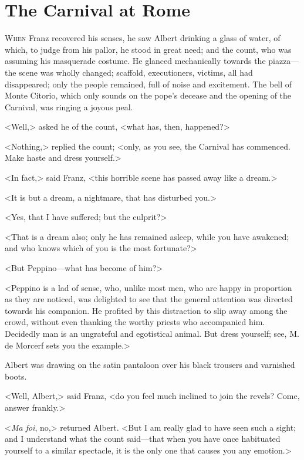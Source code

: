 \chapter{The Carnival at Rome} 

 \lettrine{W}{hen} Franz recovered his senses, he saw Albert drinking a glass of water, of which, to judge from his pallor, he stood in great need; and the count, who was assuming his masquerade costume. He glanced mechanically towards the piazza—the scene was wholly changed; scaffold, executioners, victims, all had disappeared; only the people remained, full of noise and excitement. The bell of Monte Citorio, which only sounds on the pope's decease and the opening of the Carnival, was ringing a joyous peal. 

 <Well,> asked he of the count, <what has, then, happened?> 

 <Nothing,> replied the count; <only, as you see, the Carnival has commenced. Make haste and dress yourself.> 

 <In fact,> said Franz, <this horrible scene has passed away like a dream.> 

 <It is but a dream, a nightmare, that has disturbed you.> 

 <Yes, that I have suffered; but the culprit?> 

 <That is a dream also; only he has remained asleep, while you have awakened; and who knows which of you is the most fortunate?> 

 <But Peppino—what has become of him?> 

 <Peppino is a lad of sense, who, unlike most men, who are happy in proportion as they are noticed, was delighted to see that the general attention was directed towards his companion. He profited by this distraction to slip away among the crowd, without even thanking the worthy priests who accompanied him. Decidedly man is an ungrateful and egotistical animal. But dress yourself; see, M. de Morcerf sets you the example.> 

 Albert was drawing on the satin pantaloon over his black trousers and varnished boots. 

 <Well, Albert,> said Franz, <do you feel much inclined to join the revels? Come, answer frankly.> 

 <\textit{Ma foi}, no,> returned Albert. <But I am really glad to have seen such a sight; and I understand what the count said—that when you have once habituated yourself to a similar spectacle, it is the only one that causes you any emotion.>

